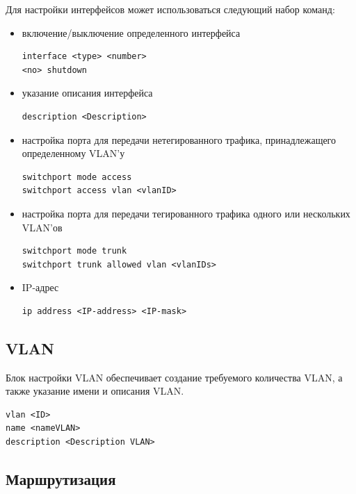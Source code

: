 Для настройки интерфейсов может использоваться следующий набор команд:
\begin{itemize}
	\item включение/выключение определенного интерфейса
	
\begin{lstlisting}
interface <type> <number>
<no> shutdown
\end{lstlisting}

	\item указание описания интерфейса
	
	\begin{lstlisting}
description <Description>
	\end{lstlisting}

	\item настройка порта для передачи нетегированного трафика, принадлежащего определенному VLAN'у
	
	\begin{lstlisting}
switchport mode access
switchport access vlan <vlanID>
	\end{lstlisting}
	
	\item настройка порта для передачи тегированного трафика одного или нескольких VLAN'ов 
	
	\begin{lstlisting}
switchport mode trunk
switchport trunk allowed vlan <vlanIDs>
	\end{lstlisting}
	
	\item IP-адрес 
	\begin{lstlisting}
ip address <IP-address> <IP-mask>
	\end{lstlisting}	
	
\end{itemize}

\subsection{VLAN}

Блок настройки VLAN обеспечивает создание требуемого количества VLAN, а также указание имени и описания VLAN.

\begin{lstlisting}
vlan <ID>
name <nameVLAN>
description <Description VLAN>
\end{lstlisting} 

\subsection{Маршрутизация}

